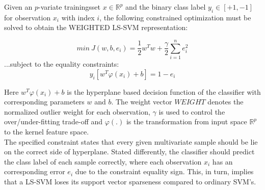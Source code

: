 \documentclass[preprint,12pt]{elsarticle}
\begin{document}

Given an $p$-variate trainingsset $x \in \mathbb{R}^p$ and the binary class label $y_i \in[+1,-1]$ for observation $x_i$ with index $i$, the following constrained optimization must be solved to obtain the WEIGHTED LS-SVM representation:

\begin{equation}
min \  J(w,b,e_i) = \frac{1}{2} w^T w + \frac{\gamma}{2} \sum_{i=1}^{n} e_i^2
\label{eq:costfunction}
\end{equation}
...subject to the equality constraints:
\begin{equation}
y_i[w^T \varphi(x_i) + b] = 1-e_i
\label{eq:lsconstraint}
\end{equation}

Here $w^T \varphi(x_i) + b$ is the hyperplane based decision function of the classifier with corresponding parameters $w$ and $b$. The weight vector $WEIGHT$ denotes the normalized outlier weight for each observation, $\gamma$ is used to control the over/under-fitting trade-off and $\varphi(.)$ is the transformation from input space $\mathbb{R}^p$ to the kernel feature space. \\

The specified constraint states that every given multivariate sample should be lie on the correct side of hyperplane. Stated differently, the classifier should predict the class label of each sample correctly, where each observation $x_i$ has an corresponding error $e_i$ due to the constraint equality sign. This, in turn, implies that a LS-SVM loses its support vector sparseness compared to ordinary SVM's. \\
\end{document}
